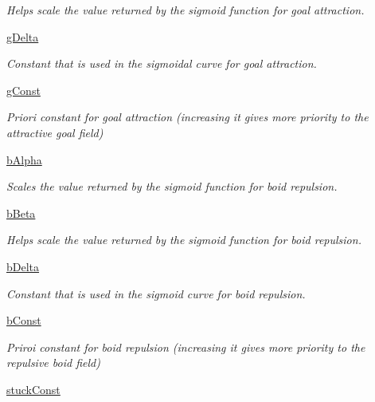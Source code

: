 \begin{DoxyCompactItemize}
\begin{DoxyCompactList}\small\item\em Helps scale the value returned by the sigmoid function for goal attraction. \end{DoxyCompactList}\item 
\hyperlink{classboid_1_1Boid_a17cd80cfac0fb27106c12e45929f9a9f}{g\-Delta}
\begin{DoxyCompactList}\small\item\em Constant that is used in the sigmoidal curve for goal attraction. \end{DoxyCompactList}\item 
\hyperlink{classboid_1_1Boid_a71d768a5bc70ecfcaec719cfd0c310ef}{g\-Const}
\begin{DoxyCompactList}\small\item\em Priori constant for goal attraction (increasing it gives more priority to the attractive goal field) \end{DoxyCompactList}\item 
\hyperlink{classboid_1_1Boid_abc7224afe02b42ee1c32ecd15d1b0a22}{b\-Alpha}
\begin{DoxyCompactList}\small\item\em Scales the value returned by the sigmoid function for boid repulsion. \end{DoxyCompactList}\item 
\hyperlink{classboid_1_1Boid_a1a48be012c505eea2e1b9f110d9bd5f3}{b\-Beta}
\begin{DoxyCompactList}\small\item\em Helps scale the value returned by the sigmoid function for boid repulsion. \end{DoxyCompactList}\item 
\hyperlink{classboid_1_1Boid_afebd87123c129406ee9e8c99f85f66a7}{b\-Delta}
\begin{DoxyCompactList}\small\item\em Constant that is used in the sigmoid curve for boid repulsion. \end{DoxyCompactList}\item 
\hyperlink{classboid_1_1Boid_a868b1d8e6fadd2b1beedc1a9f23edde5}{b\-Const}
\begin{DoxyCompactList}\small\item\em Priroi constant for boid repulsion (increasing it gives more priority to the repulsive boid field) \end{DoxyCompactList}\item 
\hyperlink{classboid_1_1Boid_abbcf546137204a45278b6caa95c4378b}{stuck\-Const}

\end{DoxyCompactItemize}

